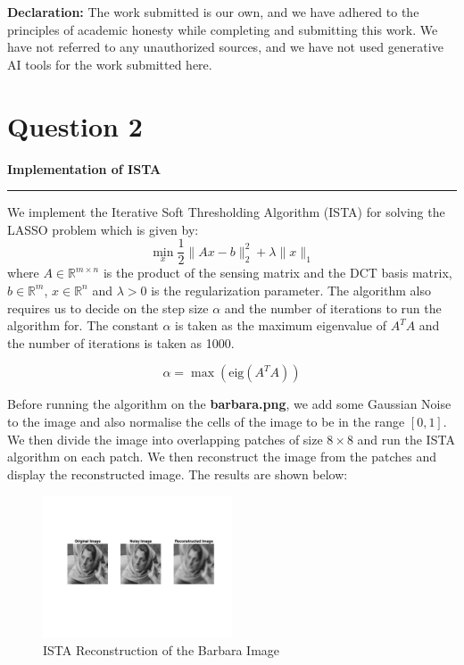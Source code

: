 \documentclass[a4paper,12pt]{article}
\title{\cooltitle{CS754 Assignment-2}}
\author{{\bf Saksham Rathi, Ekansh Ravi Shankar, Kshitij Vaidya}}
\date{}
\newenvironment{solution}[2][]{%
    \begin{mdframed}[linecolor=blue!70!black, linewidth=2pt, roundcorner=10pt, backgroundcolor=yellow!10!white, skipabove=12pt, skipbelow=12pt]%
        \textbf{\large #2}
        \par\noindent\rule{\textwidth}{0.4pt}
}{
    \end{mdframed}
}
\begin{document}
\maketitle
\textbf{Declaration:} The work submitted is our own, and
we have adhered to the principles of academic honesty while completing and submitting this work. We have not referred to any unauthorized sources, and we have not used generative AI tools for the work submitted here.

\section*{Question 2}

\begin{solution}{Implementation of ISTA}
  We implement the Iterative Soft Thresholding Algorithm (ISTA) for solving the LASSO problem which is given by:
  \begin{equation}
    \min_{x} \frac{1}{2} \|Ax - b\|_2^2 + \lambda \|x\|_1
  \end{equation}
  \noindent where $A \in \mathbb{R}^{m \times n}$ is the product of the sensing matrix and the DCT basis matrix, $b \in \mathbb{R}^m$, $x \in \mathbb{R}^n$ and $\lambda > 0$ is the regularization parameter. The algorithm also requires us to decide on the step size $\alpha$ and the number of iterations to run the algorithm for. The constant $\alpha$ is taken as the maximum eigenvalue of $A^TA$ and the number of iterations is taken as 1000. 

  \begin{equation}
    \alpha = \max(\text{eig}(A^TA))
  \end{equation}

  \noindent Before running the algorithm on the \textbf{barbara.png}, we add some Gaussian Noise to the image and also normalise the cells of the image to be in the range $[0, 1]$. We then divide the image into overlapping patches of size $8 \times 8$ and run the ISTA algorithm on each patch. We then reconstruct the image from the patches and display the reconstructed image. The results are shown below:

\end{solution}

\begin{figure}[!htbp]
  \centering
  \includegraphics[width=0.5\textwidth]{../FISTA_Barbara.png}
  \caption{ISTA Reconstruction of the Barbara Image}
\end{figure}
\end{document}

